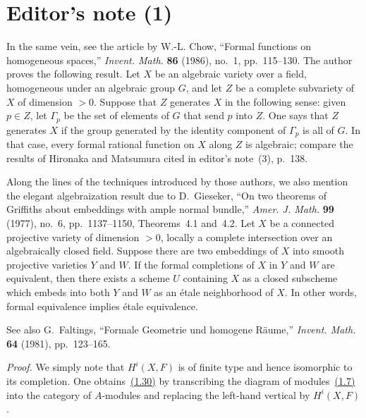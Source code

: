 \documentclass[11pt,a4paper,oneside]{book}
\theoremstyle{plain}
\theoremstyle{definition}
\theoremstyle{remark}
\begin{document}
\section*{Editor's note (1)}
In the same vein, see the article by W.-L. Chow, ``Formal functions on
homogeneous spaces,'' \emph{Invent. Math.} \textbf{86} (1986), no.~1,
pp.~115--130. The author proves the following result. Let $X$ be an algebraic
variety over a field, homogeneous under an algebraic group $G$, and let $Z$ be
a complete subvariety of $X$ of dimension $>0$. Suppose that $Z$ generates $X$
in the following sense: given $p\in Z$, let $\Gamma_p$ be the set of elements
of $G$ that send $p$ into $Z$. One says that $Z$ generates $X$ if the group
generated by the identity component of $\Gamma_p$ is all of $G$. In that case,
every formal rational function on $X$ along $Z$ is algebraic; compare the
results of Hironaka and Matsumura cited in editor's note~(3), p.~138.

Along the lines of the techniques introduced by those authors, we also mention
the elegant algebraization result due to D.~Gieseker, ``On two theorems of
Griffiths about embeddings with ample normal bundle,'' \emph{Amer. J. Math.}
\textbf{99} (1977), no.~6, pp.~1137--1150, Theorems~4.1 and~4.2. Let $X$ be a
connected projective variety of dimension $>0$, locally a complete intersection
over an algebraically closed field. Suppose there are two embeddings of $X$
into smooth projective varieties $Y$ and $W$. If the formal completions of $X$
in $Y$ and $W$ are equivalent, then there exists a scheme $U$ containing $X$
as a closed subscheme which embeds into both $Y$ and $W$ as an étale
neighborhood of $X$. In other words, formal equivalence implies étale
equivalence.

See also G.~Faltings, ``Formale Geometrie und homogene Räume,''
\emph{Invent. Math.} \textbf{64} (1981), pp.~123--165.

\medskip
{}

\noindent\emph{Proof.}\quad
We simply note that $H^i(X,F)$ is of finite type and hence isomorphic to its
completion. One obtains~\hyperref[eq:IX.1.30]{(1.30)} by transcribing the diagram of modules~\hyperref[eq:IX.1.7]{(1.7)}
into the category of $A$-modules and replacing the left-hand vertical by
$H^i(X,F)$.
\end{document}
